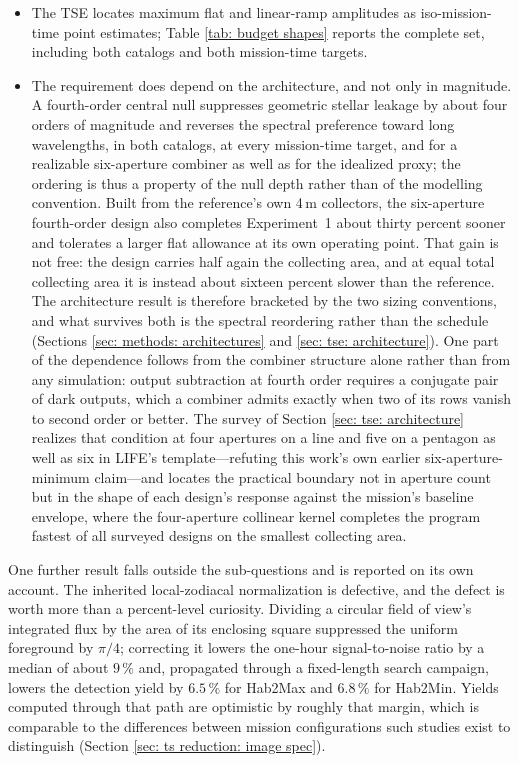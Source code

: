 \documentclass[12pt,a4paper]{article}
\numberwithin{equation}{section}
\numberwithin{figure}{section}
\numberwithin{table}{section}
\begin{document}
\begin{itemize}
    \item[\textbf{Q4}] The TSE locates maximum flat and linear-ramp amplitudes as iso-mission-time point estimates; Table \ref{tab: budget shapes} reports the complete set, including both catalogs and both mission-time targets.
    \item[\textbf{Q5}] The requirement does depend on the architecture, and not only in magnitude. A fourth-order central null suppresses geometric stellar leakage by about four orders of magnitude and reverses the spectral preference toward long wavelengths, in both catalogs, at every mission-time target, and for a realizable six-aperture combiner as well as for the idealized proxy; the ordering is thus a property of the null depth rather than of the modelling convention. Built from the reference's own 4\,m collectors, the six-aperture fourth-order design also completes Experiment~1 about thirty percent sooner and tolerates a larger flat allowance at its own operating point. That gain is not free: the design carries half again the collecting area, and at equal total collecting area it is instead about sixteen percent slower than the reference. The architecture result is therefore bracketed by the two sizing conventions, and what survives both is the spectral reordering rather than the schedule (Sections \ref{sec: methods: architectures} and \ref{sec: tse: architecture}). One part of the dependence follows from the combiner structure alone rather than from any simulation: output subtraction at fourth order requires a conjugate pair of dark outputs, which a combiner admits exactly when two of its rows vanish to second order or better. The survey of Section \ref{sec: tse: architecture} realizes that condition at four apertures on a line and five on a pentagon as well as six in LIFE's template---refuting this work's own earlier six-aperture-minimum claim---and locates the practical boundary not in aperture count but in the shape of each design's response against the mission's baseline envelope, where the four-aperture collinear kernel completes the program fastest of all surveyed designs on the smallest collecting area.
\end{itemize}

One further result falls outside the sub-questions and is reported on its own account. The inherited local-zodiacal normalization is defective, and the defect is worth more than a percent-level curiosity. Dividing a circular field of view's integrated flux by the area of its enclosing square suppressed the uniform foreground by $\pi/4$; correcting it lowers the one-hour signal-to-noise ratio by a median of about $9\,\%$ and, propagated through a fixed-length search campaign, lowers the detection yield by $6.5\,\%$ for Hab2Max and $6.8\,\%$ for Hab2Min. Yields computed through that path are optimistic by roughly that margin, which is comparable to the differences between mission configurations such studies exist to distinguish (Section \ref{sec: ts reduction: image spec}).
\end{document}
